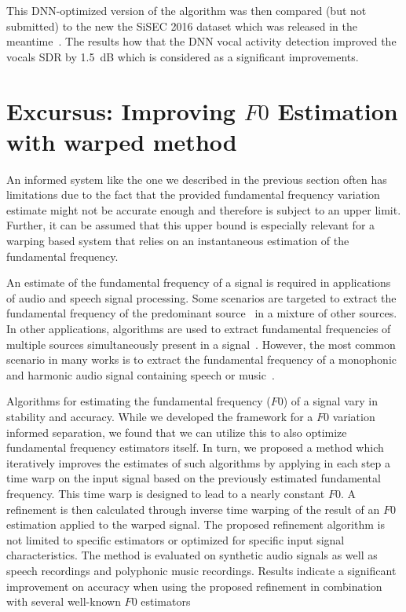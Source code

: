 This DNN-optimized version of the algorithm was then compared (but not submitted) to the new the SiSEC 2016 dataset which was released in the meantime~\cite{liutkus17}.
The results how that the DNN vocal activity detection improved the vocals SDR by 1.5~dB which is considered as a significant improvements.

\section{Excursus: Improving $F0$ Estimation with warped method} %
\label{sec:method}




An informed system like the one we described in the previous section often has limitations due to the fact that the provided fundamental frequency variation estimate might not be accurate enough and therefore is subject to an upper limit.
Further, it can be assumed that this upper bound is especially relevant for a warping based system that relies on an instantaneous estimation of the fundamental frequency.
\par
An estimate of the fundamental frequency of a signal is required in applications of audio and speech signal processing.
Some scenarios are targeted to extract the fundamental frequency of the predominant source~\cite{salamon12} in a mixture of other sources.
In other applications, algorithms are used to extract fundamental frequencies of multiple sources simultaneously present in a signal~\cite{klapuri03}.
However, the most common scenario in many works is to extract the fundamental frequency of a monophonic and harmonic audio signal containing speech or music~\cite{talkin95, boersma02, decheveigne02, resch07, tidhar10, christensen07}.
\par
Algorithms for estimating the fundamental frequency ($F0$) of a signal vary in stability and accuracy.
While we developed the framework for a $F0$ variation informed separation, we found that we can utilize this to also optimize fundamental frequency estimators itself.
In turn, we proposed a method which iteratively improves the estimates of such algorithms by applying in each step a time warp on the input signal based on the previously estimated fundamental frequency.
This time warp is designed to lead to a nearly constant $F0$. A refinement is then calculated through inverse time warping of the result of an $F0$ estimation applied to the warped signal. The proposed refinement algorithm is not limited to specific estimators or optimized for specific input signal characteristics. The method is evaluated on synthetic audio signals as well as speech recordings and polyphonic music recordings. Results indicate a significant improvement on accuracy when using the proposed refinement in combination with several well-known $F0$ estimators

